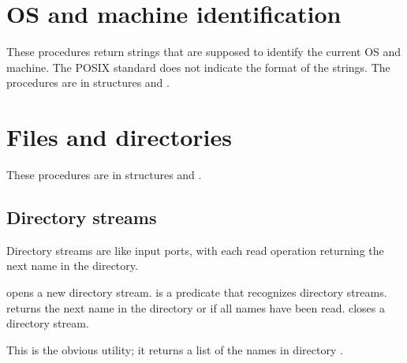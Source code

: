 \section{OS and machine identification}

These procedures return strings that are supposed to identify the current
 OS and machine.
The POSIX standard does not indicate the format of the strings.
The procedures are in structures  and .

\begin{protos}
\end{protos}


\section{Files and directories}

These procedures are in structures  and .

\subsection{Directory streams}

Directory streams are like input ports, with each read operation
 returning the next name in the directory.

\begin{protos}
\end{protos}
\noindent
{} opens a new directory stream.
 is a predicate that recognizes directory streams.
 returns the next name in the directory or
  if all names have been read.
 closes a directory stream.

\begin{protos}
\end{protos}
\noindent
This is the obvious utility; it returns a list of the names in directory
 .

